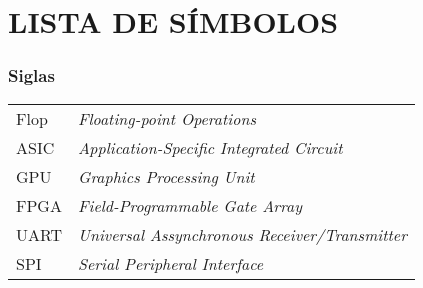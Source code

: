                       

\chapter*{LISTA DE SÍMBOLOS} %

\subsection*{Siglas}
\begin{tabular}{p{}p{}}
Flop & \textit{Floating-point Operations}\\
ASIC & \textit{Application-Specific Integrated Circuit}\\
GPU & \textit{Graphics Processing Unit}\\
FPGA & \textit{Field-Programmable Gate Array}\\
UART & \textit{Universal Assynchronous Receiver/Transmitter}\\
SPI & \textit{Serial Peripheral Interface}\\
\end{tabular}

